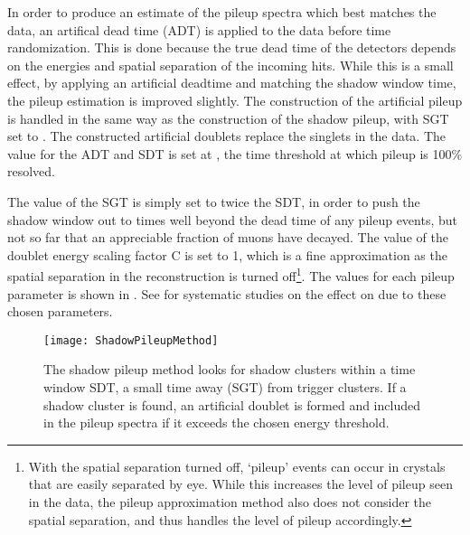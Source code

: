 In order to produce an estimate of the pileup spectra which best matches the data, an artifical dead time (ADT) is applied to the data before time randomization. This is done because the true dead time of the detectors depends on the energies and spatial separation of the incoming hits. While this is a small effect, by applying an artificial deadtime and matching the shadow window time, the pileup estimation is improved slightly. The construction of the artificial pileup is handled in the same way as the construction of the shadow pileup, with SGT set to . The constructed artificial doublets replace the singlets in the data. The value for the ADT and SDT is set at , the time threshold at which pileup is 100\% resolved. 

The value of the SGT is simply set to twice the SDT, in order to push the shadow window out to times well beyond the dead time of any pileup events, but not so far that an appreciable fraction of muons have decayed. The value of the doublet energy scaling factor C is set to 1, which is a fine approximation as the spatial separation in the reconstruction is turned off\footnote{With the spatial separation turned off, `pileup' events can occur in crystals that are easily separated by eye. While this increases the level of pileup seen in the data, the pileup approximation method also does not consider the spatial separation, and thus handles the level of pileup accordingly.}. The values for each pileup parameter is shown in . See  for systematic studies on the effect on \wa due to these chosen parameters.



\begin{figure}[]
    \centering
    \texttt{[image: ShadowPileupMethod]}
    \caption[Shadow pileup method]{The shadow pileup method looks for shadow clusters within a time window SDT, a small time away (SGT) from trigger clusters. If a shadow cluster is found, an artificial doublet is formed and included in the pileup spectra if it exceeds the chosen energy threshold.}
    \label{fig:ShadowPileupMethod}
\end{figure}



